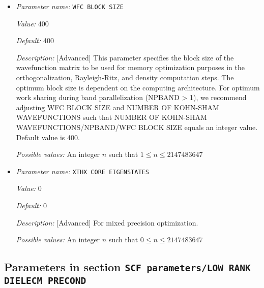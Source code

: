 \begin{itemize}
{\it Possible values:} A boolean value (true or false)
\item {\it Parameter name:} {\tt WFC BLOCK SIZE}
\label{parameters:SCF parameters/Eigen_2dsolver parameters/WFC BLOCK SIZE}
\label{parameters:SCF_20parameters/Eigen_2dsolver_20parameters/WFC_20BLOCK_20SIZE}


{\it Value:} 400


{\it Default:} 400


{\it Description:} [Advanced]  This parameter specifies the block size of the wavefunction matrix to be used for memory optimization purposes in the orthogonalization, Rayleigh-Ritz, and density computation steps. The optimum block size is dependent on the computing architecture. For optimum work sharing during band parallelization (NPBAND > 1), we recommend adjusting WFC BLOCK SIZE and NUMBER OF KOHN-SHAM WAVEFUNCTIONS such that NUMBER OF KOHN-SHAM WAVEFUNCTIONS/NPBAND/WFC BLOCK SIZE equals an integer value. Default value is 400.


{\it Possible values:} An integer $n$ such that $1\leq n \leq 2147483647$
\item {\it Parameter name:} {\tt XTHX CORE EIGENSTATES}
\label{parameters:SCF parameters/Eigen_2dsolver parameters/XTHX CORE EIGENSTATES}
\label{parameters:SCF_20parameters/Eigen_2dsolver_20parameters/XTHX_20CORE_20EIGENSTATES}


{\it Value:} 0


{\it Default:} 0


{\it Description:} [Advanced] For mixed precision optimization.


{\it Possible values:} An integer $n$ such that $0\leq n \leq 2147483647$
\end{itemize}

\subsection{Parameters in section \tt SCF parameters/LOW RANK DIELECM PRECOND}
\label{parameters:SCF_20parameters/LOW_20RANK_20DIELECM_20PRECOND}

